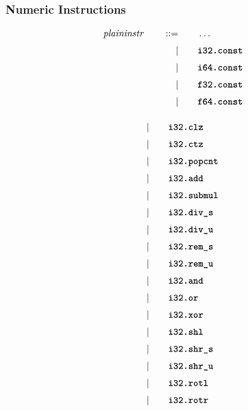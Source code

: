 \subsubsection{Numeric Instructions}
\begin{alignat*}{9}
    && \textit{plaininstr}\ &&\quad ::= &\quad && \dots \quad &&  \\[1mm]
  &&       &&\quad | &\quad && \textbf{\texttt{i32.const}} \quad &&  \\[1mm]
  &&       &&\quad | &\quad && \textbf{\texttt{i64.const}} \quad &&  \\[1mm]
  &&       &&\quad | &\quad && \textbf{\texttt{f32.const}} \quad &&  \\[1mm]
  &&       &&\quad | &\quad && \textbf{\texttt{f64.const}} \quad &&  \\[1mm]
\end{alignat*}

\begin{alignat*}{9}
    &&       &&\quad | &\quad && \textbf{\texttt{i32.clz}} \quad &&  \\[1mm]
    &&       &&\quad | &\quad && \textbf{\texttt{i32.ctz}} \quad &&  \\[1mm]
    &&       &&\quad | &\quad && \textbf{\texttt{i32.popcnt}} \quad &&  \\[1mm]
    &&       &&\quad | &\quad && \textbf{\texttt{i32.add}} \quad &&  \\[1mm]
    &&       &&\quad | &\quad && \textbf{\texttt{i32.submul}} \quad &&  \\[1mm]
    &&       &&\quad | &\quad && \textbf{\texttt{i32.div\textunderscore s}} \quad &&  \\[1mm]
    &&       &&\quad | &\quad && \textbf{\texttt{i32.div\textunderscore u}} \quad &&  \\[1mm]
    &&       &&\quad | &\quad && \textbf{\texttt{i32.rem\textunderscore s}} \quad &&  \\[1mm]
    &&       &&\quad | &\quad && \textbf{\texttt{i32.rem\textunderscore u}} \quad &&  \\[1mm]
    &&       &&\quad | &\quad && \textbf{\texttt{i32.and}} \quad &&  \\[1mm]
    &&       &&\quad | &\quad && \textbf{\texttt{i32.or}} \quad &&  \\[1mm]
    &&       &&\quad | &\quad && \textbf{\texttt{i32.xor}} \quad &&  \\[1mm]
    &&       &&\quad | &\quad && \textbf{\texttt{i32.shl}} \quad &&  \\[1mm]
    &&       &&\quad | &\quad && \textbf{\texttt{i32.shr\textunderscore s}} \quad &&  \\[1mm]
    &&       &&\quad | &\quad && \textbf{\texttt{i32.shr\textunderscore u}} \quad &&  \\[1mm]
    &&       &&\quad | &\quad && \textbf{\texttt{i32.rotl}} \quad &&  \\[1mm]
    &&       &&\quad | &\quad && \textbf{\texttt{i32.rotr}} \quad &&  \\[1mm]
\end{alignat*}


